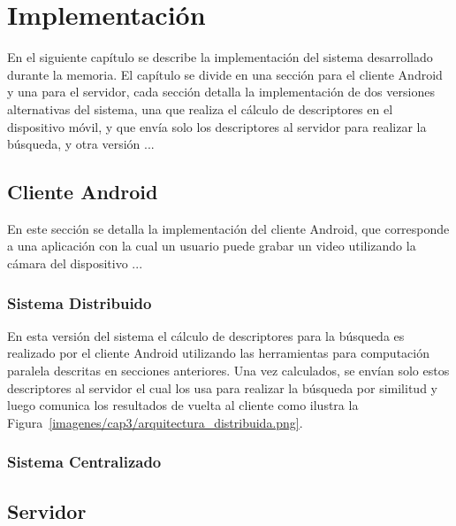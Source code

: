 \chapter{Implementación}
En el siguiente capítulo se describe la implementación del sistema desarrollado durante la memoria. El capítulo se divide en una sección para el cliente Android y una para el servidor, cada sección detalla la implementación de dos versiones alternativas del sistema, una que realiza el cálculo de descriptores en el dispositivo móvil, y que envía solo los descriptores al servidor para realizar la búsqueda, y otra versión ...
\section{Cliente Android}
En este sección se detalla la implementación del cliente Android, que corresponde a una aplicación con la cual un usuario puede grabar un video utilizando la cámara del dispositivo ... 

\subsection{Sistema Distribuido}
En esta versión del sistema el cálculo de descriptores para la búsqueda es realizado por el cliente Android utilizando las herramientas para computación paralela descritas en secciones anteriores. Una vez calculados, se envían solo estos descriptores al servidor el cual los usa para realizar la búsqueda por similitud y luego comunica los resultados de vuelta al cliente como ilustra la Figura~\ref{imagenes/cap3/arquitectura_distribuida.png}. 





\subsection{Sistema Centralizado}

\section{Servidor}

\lipsum[50-60]